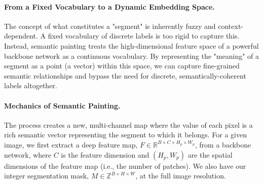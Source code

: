 \paragraph{From a Fixed Vocabulary to a Dynamic Embedding Space.}
The concept of what constitutes a "segment" is inherently fuzzy and context-dependent. A fixed vocabulary of discrete labels is too rigid to capture this. Instead, semantic painting treats the high-dimensional feature space of a powerful backbone network as a continuous vocabulary. By representing the "meaning" of a segment as a point (a vector) within this space, we can capture fine-grained semantic relationships and bypass the need for discrete, semantically-coherent labels altogether.

\paragraph{Mechanics of Semantic Painting.}
The process creates a new, multi-channel map where the value of each pixel is a rich semantic vector representing the segment to which it belongs. For a given image, we first extract a deep feature map, $F \in \mathbb{R}^{B \times C \times H_p \times W_p}$, from a backbone network, where $C$ is the feature dimension and $(H_p, W_p)$ are the spatial dimensions of the feature map (i.e., the number of patches). We also have our integer segmentation mask, $M \in \mathbb{Z}^{B \times H \times W}$, at the full image resolution.

